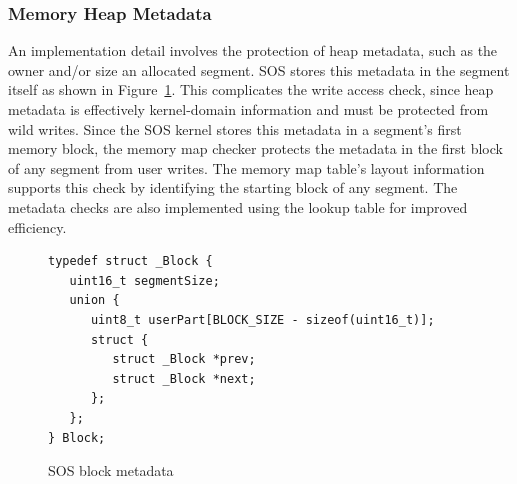 \subsubsection{Memory Heap Metadata}
%
%
An implementation detail involves the protection of heap metadata, such as
the owner and/or size an allocated segment.
%
SOS stores this metadata in the segment itself as shown in
Figure~\ref{fig:sos_free_list}.
%
This complicates the write access check, since heap metadata is
effectively kernel-domain information and must be protected from wild
writes.
%
%
%
%
%
Since the SOS kernel stores this metadata in a segment's first
memory block, %
%
%
%
%
the memory map checker protects the metadata in
the first block of any segment from user writes.
%
The memory map table's layout information supports this check by
identifying the starting block of any segment.
%
The metadata checks are also implemented using the lookup table for
improved efficiency.
%
\begin{figure} [h]
  \centering
    {\tiny
\begin{verbatim}
typedef struct _Block {
   uint16_t segmentSize;
   union {
      uint8_t userPart[BLOCK_SIZE - sizeof(uint16_t)];
      struct {
         struct _Block *prev;
         struct _Block *next;
      };
   };
} Block;
\end{verbatim} }
\caption{SOS block metadata}
\label{fig:sos_free_list}
\end{figure}
%
%
%
%
%
